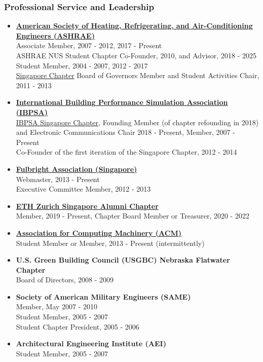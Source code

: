 \documentclass[10pt,a4paper]{article}
\begin{document}
\begin{small}
\subsubsection*{Professional Service and Leadership}


\begin{itemize}

  \item \textbf{\href{http://www.ashrae.org/}{American Society of Heating, Refrigerating, and Air-Conditioning Engineers (ASHRAE)}}\\
  Associate Member, 2007 - 2012, 2017 - Present\\ 
  ASHRAE NUS Student Chapter Co-Founder, 2010, and Advisor, 2018 - 2025\\
  Student Member, 2004 - 2007, 2012 - 2017\\
  \href{https://www.ashrae.org.sg/}{Singapore Chapter} Board of Governors Member and Student Activities Chair, 2011 - 2013
  \item \textbf{\href{http://www.ibpsa.org/}{International Building Performance Simulation Association (IBPSA)}}\\
  \href{https://ibpsasingapore.org/}{IBPSA Singapore Chapter}, Founding Member (of chapter refounding in 2018) and Electronic Communications Chair 2018 - Present, Member, 2007 - Present\\
  Co-Founder of the first iteration of the Singapore Chapter, 2012 - 2014
  \item \textbf{\href{https://fulbrightsg.org/}{Fulbright Association (Singapore)}}\\
  Webmaster, 2013 - Present\\
  Executive Committee Member, 2012 - 2013
  \item \textbf{\href{https://www.alumni.ethz.ch/en/mitgliederorganisationen/asien-und-australien/singapore-chapter.html}{ETH Zurich Singapore Alumni Chapter}}\\
  Member, 2019 - Present, Chapter Board Member or Treasurer, 2020 - 2022
  \item \textbf{\href{https://www.acm.org/}{Association for Computing Machinery (ACM)}}\\
  Student Member or Member, 2013 - Present (intermittently)
  \item \textbf{U.S. Green Building Council (USGBC) Nebraska Flatwater Chapter}\\
  Board of Directors, 2008 - 2009
  \item \textbf{Society of American Military Engineers (SAME)}\\
  Member, May 2007 - 2010\\
  Student Member, 2005 - 2007\\
  Student Chapter President, 2005 - 2006
  \item \textbf{Architectural Engineering Institute (AEI)}\\
  Student Member, 2005 - 2007\\


\end{itemize}
\end{small}
\end{document}
